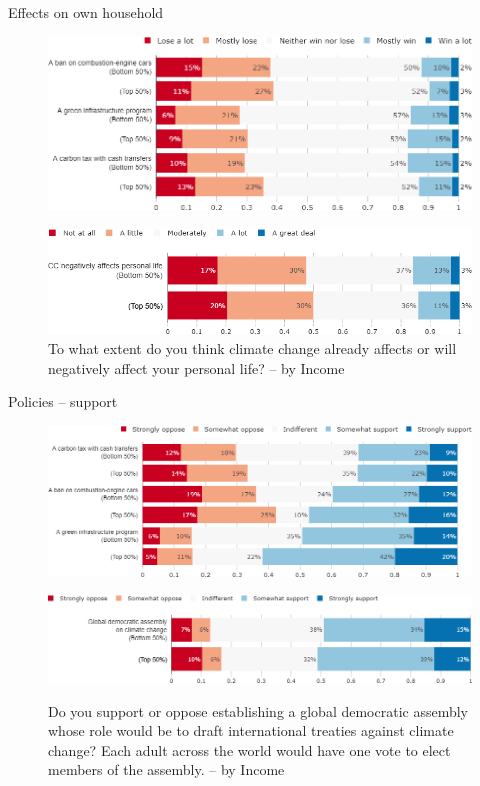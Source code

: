 \documentclass[aspectratio=169,9pt,dvipsnames]{beamer}
\begin{document}
\begin{frame}{Effects on own household}%
\begin{figure}[h!]
\caption{Do you think that financially your household would win or lose from the following policy? -- by Income}
\includegraphics[width=.6\textwidth]{../figures/DK/policies_win_lose_self_DK_inc.png} \\
\vspace{.1cm}
\caption{To what extent do you think climate change already affects or will negatively affect your personal life? -- by Income}
\includegraphics[width=.5\textwidth]{../figures/DK/CC_affects_self_DK_inc.png}
\end{figure}
\end{frame}

\begin{frame}{Policies – support}%
\vspace{-.5cm}
\begin{figure}[h!]
\caption{Do you support or oppose the following policy? -- by Income}
\includegraphics[width=.6\textwidth]{../figures/DK/policies_support_DK_inc.png} \\
\vspace{.5cm}
\caption{Do you support or oppose establishing a global democratic assembly whose role would be to draft international treaties against climate change? Each adult across the world would have one vote to elect members of the assembly. -- by Income}
\includegraphics[width=.6\textwidth]{../figures/DK/global_assembly_support_DK_inc.png} \\
\end{figure}
\end{frame}
\end{document}
